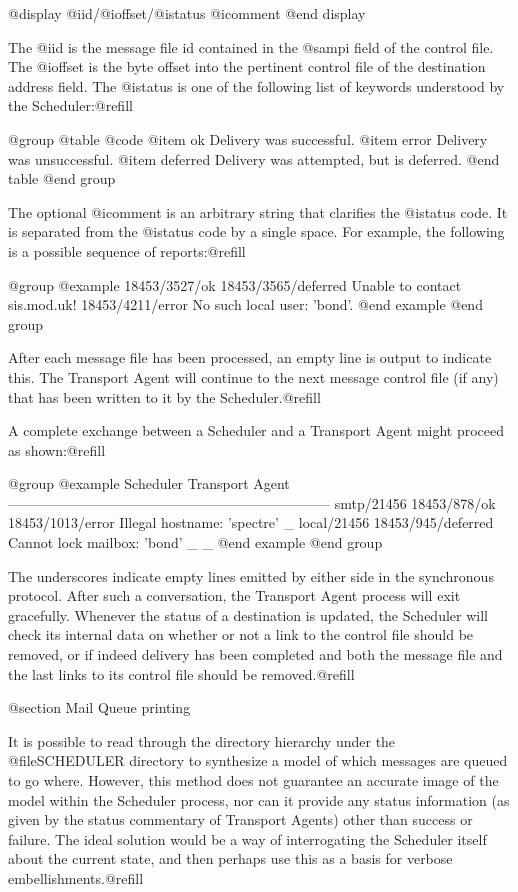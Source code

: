 {{@display
@i{id}/@i{offset}/@i{status} @i{comment}
@end display

The @i{id} is the message file id contained in the @samp{i} field of the
control file.  The @i{offset} is the byte offset into the pertinent control
file of the destination address field.  The @i{status} is one of the
following list of keywords understood by the Scheduler:@refill

@group
@table @code
@item ok
Delivery was successful.
@item error
Delivery was unsuccessful.
@item deferred
Delivery was attempted, but is deferred.
@end table
@end group

The optional @i{comment} is an arbitrary string that clarifies the @i{status}
code.  It is separated from the @i{status} code by a single space.
For example, the following is a possible sequence of reports:@refill

@group
@example
18453/3527/ok
18453/3565/deferred Unable to contact sis.mod.uk!
18453/4211/error No such local user: 'bond'.
@end example
@end group

After each message file has been processed, an empty line is output to
indicate this.  The Transport Agent will continue to the next message control
file (if any) that has been written to it by the Scheduler.@refill

A complete exchange between a Scheduler and a Transport Agent might proceed
as shown:@refill

@group
@example
Scheduler          Transport Agent
---------------------------------------------------------------------
smtp/21456
                   18453/878/ok
                   18453/1013/error Illegal hostname: 'spectre'
                   _
local/21456
                   18453/945/deferred Cannot lock mailbox: 'bond'
                   _
_
@end example
@end group

The underscores indicate empty lines emitted by either side in the
synchronous protocol.  After such a conversation, the Transport Agent process
will exit gracefully.  Whenever the status of a destination is updated, the
Scheduler will check its internal data on whether or not a link to the
control file should be removed, or if indeed delivery has been completed and
both the message file and the last links to its control file should be
removed.@refill

@section Mail Queue printing

It is possible to read through the directory hierarchy under
the @file{SCHEDULER} directory to synthesize a model of which messages
are queued to go where.  However, this method does not guarantee an accurate
image of the model within the Scheduler process, nor can it provide any
status information (as given by the status commentary of Transport Agents)
other than success or failure.  The ideal solution would be a way of
interrogating the Scheduler itself about the current state, and then perhaps
use this as a basis for verbose embellishments.@refill

}}
